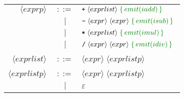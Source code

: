 \documentclass{article}
\newcommand{\cmd}[1]{\textcolor{MyGreen}{\{\, #1 \,\}} \;}
\newcommand{\node}[1]{\langle #1 \rangle \;}
\begin{document}
\begin{center}
\begin{tabular}{ r c l }
      $\node{exprp}$      & $::=$ & $\texttt{+}\; \node{exprlist} \cmd{emit(iadd)}$ \\
                          &  $|$  & $\texttt{-}\; \node{expr} \node{expr} \cmd{emit(isub)}$ \\
                          &  $|$  & $\texttt{*}\; \node{exprlist} \cmd{emit(imul)}$ \\
                          &  $|$  & $\texttt{/}\; \node{expr} \node{expr} \cmd{emit(idiv)}$ \\\\
      $\node{exprlist}$   & $::=$ & $\node{expr} \node{exprlistp}$ \\\\
      $\node{exprlistp}$  & $::=$ & $\node{expr} \node{exprlistp}$ \\
                          &  $|$  & $\varepsilon$ \\
    \end{tabular}
  \end{center}
\end{document}
